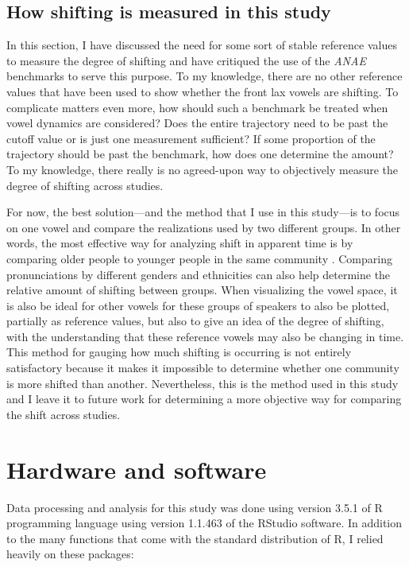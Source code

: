 \subsection{How shifting is measured in this study}

In this section, I have discussed the need for some sort of stable reference values to measure the degree of shifting and have critiqued the use of the \textit{ANAE} benchmarks to serve this purpose. To my knowledge, there are no other reference values that have been used to show whether the front lax vowels are shifting. To complicate matters even more, how should such a benchmark be treated when vowel dynamics are considered? Does the entire trajectory need to be past the cutoff value or is just one measurement sufficient? If some proportion of the trajectory should be past the benchmark, how does one determine the amount? To my knowledge, there really is no agreed-upon way to objectively measure the degree of shifting across studies.

For now, the best solution---and the method that I use in this study---is to focus on one vowel and compare the realizations used by two different groups. In other words, the most effective way for analyzing shift in apparent time is by comparing older people to younger people in the same community \citep{boberg_2005, cardoso_etal_2016_pads, holland_brandenburg_2017_pads, hall_lew_etal_2017}. Comparing pronunciations by different genders and ethnicities \citep{brumbaugh_koops_2017_pads} can also help determine the relative amount of shifting between groups. When visualizing the vowel space, it is also be ideal for other vowels for these groups of speakers to also be plotted, partially as reference values, but also to give an idea of the degree of shifting, with the understanding that these reference vowels may also be changing in time. This method for gauging how much shifting is occurring is not entirely satisfactory because it makes it impossible to determine whether one community is more shifted than another. Nevertheless, this is the method used in this study and I leave it to future work for determining a more objective way for comparing the shift across studies.

\section{Hardware and software}
\label{r_packages}

Data processing and analysis for this study was done using version 3.5.1 of R programming language \citep{r_2018} using version 1.1.463 of the RStudio software. In addition to the many functions that come with the standard distribution of R, I relied heavily on these packages:

